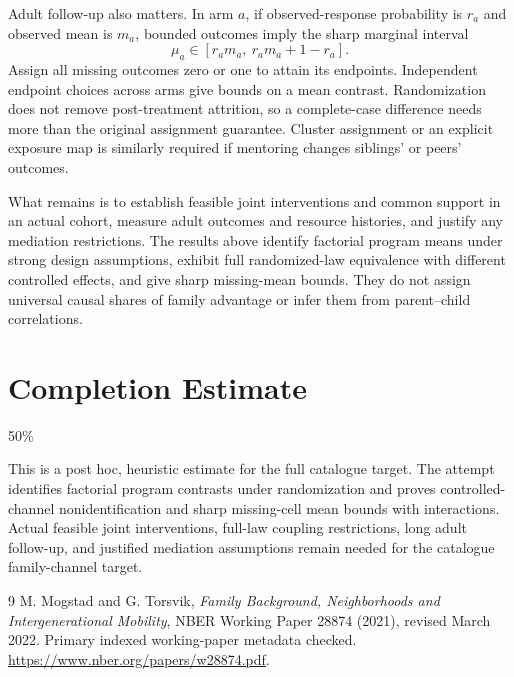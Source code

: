 \documentclass[11pt,a4paper]{article}
\begin{document}
Adult follow-up also matters. In arm $a$, if observed-response probability is $r_a$ and observed mean is $m_a$, bounded outcomes imply the sharp marginal interval
\[
 \mu_a\in[r_am_a,\ r_am_a+1-r_a].                         \tag{5}
\]
Assign all missing outcomes zero or one to attain its endpoints. Independent endpoint choices across arms give bounds on a mean contrast. Randomization does not remove post-treatment attrition, so a complete-case difference needs more than the original assignment guarantee. Cluster assignment or an explicit exposure map is similarly required if mentoring changes siblings' or peers' outcomes.

What remains is to establish feasible joint interventions and common support in an actual cohort, measure adult outcomes and resource histories, and justify any mediation restrictions. The results above identify factorial program means under strong design assumptions, exhibit full randomized-law equivalence with different controlled effects, and give sharp missing-mean bounds. They do not assign universal causal shares of family advantage or infer them from parent--child correlations.

\section{Completion Estimate}
50\%

This is a post hoc, heuristic estimate for the full catalogue target.
The attempt identifies factorial program contrasts under randomization and proves controlled-channel nonidentification and sharp missing-cell mean bounds with interactions. Actual feasible joint interventions, full-law coupling restrictions, long adult follow-up, and justified mediation assumptions remain needed for the catalogue family-channel target.

\begin{thebibliography}{9}
 M. Mogstad and G. Torsvik, \emph{Family Background, Neighborhoods and Intergenerational Mobility}, NBER Working Paper 28874 (2021), revised March 2022. Primary indexed working-paper metadata checked. \url{https://www.nber.org/papers/w28874.pdf}.
\end{thebibliography}
\end{document}
